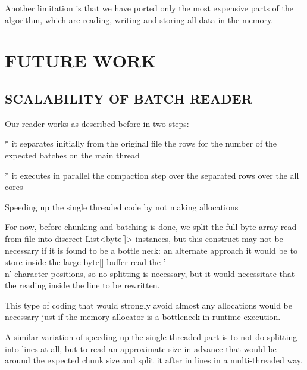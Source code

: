 \documentclass[a4paper,twoside]{article}
\begin{document}
Another limitation is that we have ported only the most expensive parts of the algorithm, which are reading,  writing and storing all data in the memory. 












\section{\uppercase{Future work}}\label{sec:uppercase}

\subsection{\uppercase{Scalability of batch reader}}\label{subsec:uppercase5}

Our reader works as described before in two steps:

* it separates initially from the original file the rows for the number of the expected batches on the main thread

* it executes in parallel the compaction step over the separated rows over the all cores

Speeding up the single threaded code by not making allocations

For now, before chunking and batching is done, we split the full byte array read from file into discreet List<byte[]> instances,
but this construct may not be necessary if it is found to be a bottle neck: an alternate approach it would be to store inside the large byte[]
buffer read the '\\n' character positions, so no splitting is necessary, but it would necessitate that the reading inside the line to be rewritten.

This type of coding that would strongly avoid almost any allocations would be necessary just if the memory allocator is a bottleneck in runtime execution.

A similar variation of speeding up the single threaded part is to not do splitting into lines at all, but to read an approximate size in advance that would be around the expected chunk size
and split it after in lines in a multi-threaded way.
\end{document}
